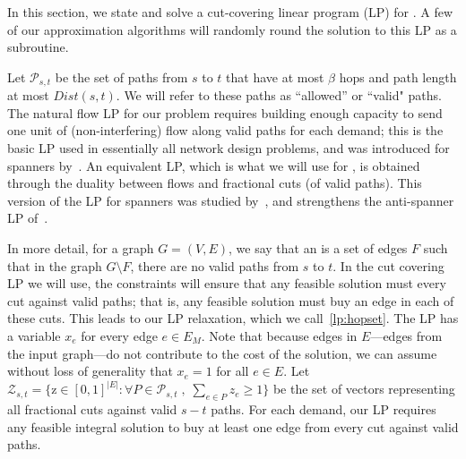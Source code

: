 


\begin{comment}
The natural relaxation of this problem is the following LP, where each edge in $E_M$ has a variable $x_e$ and cost $c_e=1$ if $e \in E$ or $c_e=0$ if $e \not \in E$. We also have a variable $f_P$ for every allowed path. The LP ensures that (integrally) for each pair of demands one hopbounded path with desired stretch is chosen. 
 
\begin{align} \label{lp:flow}
\min \quad &\sum_{e \in E_M}c_ex_e \nonumber\\
\text{s.t.} \quad &\sum_{P \in \mathcal{P}_{u,v}: e\in P} f_P\leq x_e  &\forall(u,v) \in  \mathcal{D}, \forall e \in E_M  \nonumber \\
&\sum_{P \in \mathcal{P}_{u,v}} f_P \geq 1 &\forall(u,v) \in  \mathcal{D}\\
&x_e \geq 0 &\forall	e \in E_M \nonumber \\
&f_P \geq 0 &\forall(u,v)\in  \mathcal{D}, \forall P\in \mathcal{P}_{u,v} \nonumber
\end{align}
\end{comment}

In this section, we state and solve a cut-covering linear program (LP) for {\hopset}. A few of our approximation algorithms will randomly round the solution to this LP as a subroutine. 

Let $\mathcal{P}_{s,t}$ be the set of paths from $s$ to $t$ that have at most $\beta$ hops and path length at most $Dist(s,t)$. We will refer to these paths as ``allowed'' or ``valid" paths. The natural flow LP for our problem requires building enough capacity to send one unit of (non-interfering) flow along valid paths for each demand; this is the basic LP used in essentially all network design problems, and was introduced for spanners by~\cite{DK11}.  An equivalent LP, which is what we will use for {\hopset}, is obtained through the duality between flows and fractional cuts (of valid paths).  This version of the LP for spanners was studied by~\cite{DNZ20}, and strengthens the anti-spanner LP of~\cite{BBMRY11}. 

In more detail, for a graph $G = (V,E)$, we say that an  is a set of edges $F$ such that in the graph $G \setminus F$, there are no valid paths from $s$ to $t$. In the cut covering LP we will use, the constraints will ensure that any feasible solution must  every cut against valid paths; that is, any feasible solution must buy an edge in each of these cuts. This leads to our LP relaxation, which we call~\ref{lp:hopset}. The LP has a variable $x_e$ for every edge $e \in E_M$. Note that because edges in $E$---edges from the input graph---do not contribute to the cost of the solution, we can assume without loss of generality that $x_e = 1$ for all $e \in E$.  
Let $\mathcal{Z}_{s,t} = \{ \bm{\mathrm{z}} \in [0,1]^{|E|} : \forall P \in \mathcal{P}_{s,t} \; , \; \sum_{e \in P} z_e \geq 1 \}$ be the set of vectors representing all fractional cuts against valid $s-t$ paths. For each demand, our LP requires any feasible integral solution to buy at least one edge from every cut against valid paths.

